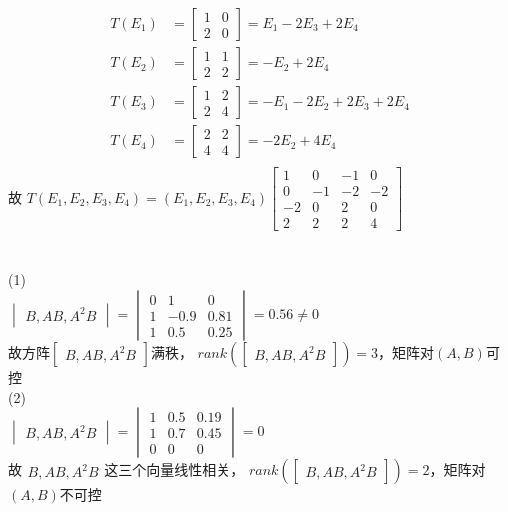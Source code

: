 \documentclass{article}
\begin{document}
\begin{equation}
	\begin{aligned}
		T(E_1)&=\begin{bmatrix}1 & 0\\2 & 0\end{bmatrix}=E_1-2E_3+2E_4\\
		T(E_2)&=\begin{bmatrix}1 & 1\\2 & 2\end{bmatrix}=-E_2+2E_4\\
		T(E_3)&=\begin{bmatrix}1 & 2\\2 & 4\end{bmatrix}=-E_1-2E_2+2E_3+2E_4\\
		T(E_4)&=\begin{bmatrix}2 & 2\\4 & 4\end{bmatrix}=-2E_2+4E_4\\
	\end{aligned}
\end{equation}
故
$ T(E_1,E_2,E_3,E_4)=(E_1,E_2,E_3,E_4)\begin{bmatrix}1 & 0 & -1 & 0\\0 & -1 & -2 & -2\\ -2 & 0 & 2 & 0\\ 2 & 2 & 2 & 4\end{bmatrix} $

\section{}
(1)\\
$\begin{vmatrix}B,AB,A^2B
\end{vmatrix}=\begin{vmatrix}0& 1 & 0\\1& -0.9& 0.81\\1 & 0.5 & 0.25
\end{vmatrix}=0.56\neq 0$\\
故方阵$ \begin{bmatrix}B,AB,A^2B
\end{bmatrix} $满秩， $ rank(\begin{bmatrix}B,AB,A^2B
\end{bmatrix})=3 $，矩阵对$ (A,B) $可控\\
(2)\\
$\begin{vmatrix}B,AB,A^2B
\end{vmatrix}=\begin{vmatrix}1& 0.5 & 0.19\\1& 0.7& 0.45\\0 & 0 & 0
\end{vmatrix}=0$\\
故$ \begin{matrix}B,AB,A^2B
\end{matrix} $这三个向量线性相关， $ rank(\begin{bmatrix}B,AB,A^2B
\end{bmatrix})=2 $，矩阵对$ (A,B) $不可控
\end{document}
